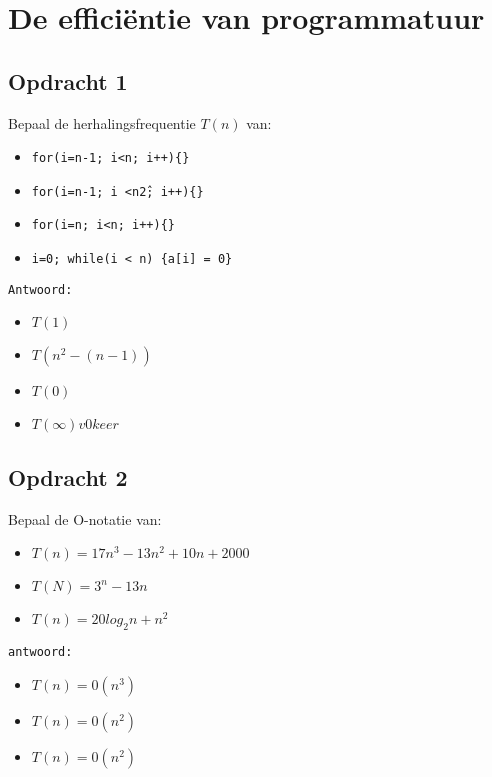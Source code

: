 \chapter{De effici\"{e}ntie van programmatuur}
\section{Opdracht 1}
Bepaal de herhalingsfrequentie $T(n)$ van:
  \begin{itemize}
    \item \texttt{for(i=n-1; i<n; i++)\{\}}
    \item \texttt{for(i=n-1; i <n\^2; i++)\{\}}
    \item \texttt{for(i=n; i<n; i++)\{\}}
    \item \texttt{i=0; while(i < n) \{a[i] = 0\}}
  \end{itemize}

\texttt{Antwoord:}

\begin{itemize}
  \item $T(1)$
  \item $T(n^2 - (n - 1))$
  \item $T(0)$
  \item $T(\infty) v 0 keer$
\end{itemize}

\section{Opdracht 2}
Bepaal de O-notatie van:
\begin{itemize}
  \item $T(n)=17n^3-13n^2+10n+2000$
  \item $T(N)=3^n-13n$
  \item $T(n)=20log_2n+n^2$
\end{itemize}

\texttt{antwoord:}

\begin{itemize}
  \item $T(n) = 0(n^3)$
  \item $T(n) = 0(n^2)$
  \item $T(n) = 0(n^2)$
\end{itemize}

